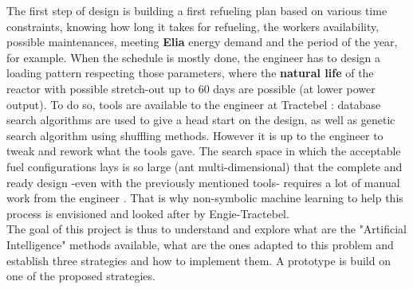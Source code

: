 \noindent The first step of design is building a first refueling plan based on various time constraints, knowing how long it takes for refueling, the workers availability, possible maintenances, meeting \textbf{Elia} energy demand and the period of the year, for example. When the schedule is mostly done, the engineer has to design a loading pattern respecting those parameters, where the \textbf{natural life} of the reactor with possible stretch-out up to 60 days are possible (at lower power output). To do so, tools are available to the engineer at Tractebel : database search algorithms are used to give a head start on the design, as well as genetic search algorithm using shuffling methods. However it is up to the engineer to tweak and rework what the tools gave. The search space in which the acceptable fuel configurations lays is so large (ant multi-dimensional) that the complete and ready design -even with the previously mentioned tools- requires a lot of manual work from the engineer \cite{ephraim19}. That is why non-symbolic machine learning to help this process is envisioned and looked after by Engie-Tractebel. \\

\noindent The goal of this project is thus to understand and explore what are the "Artificial Intelligence" methods available, what are the ones adapted to this problem and establish three strategies and how to implement them. A prototype is build on one of the proposed strategies. 

\begin{comment}
\noindent To be clear, the loading pattern design has to be completely defined from the local crayons fission parameters, which would be the reactivity, local burnup, global criticality, and local criticality. Moreover locally the cells in the reactor have preferential directions for neutron transport. That has to be taken into account when designing the loading pattern. Finally (and this is more specific to Tihange 2 reactor, but can be for all reactors), the heat peak delta f has to be minimized and non-local on the edges of the reactor to avoid a neutronic bombardment too high on the reflectors. \\

\noindent The loading pattern is usually completely managed by hand, after using internal tools based on genetic algorithm and database comparison. For designing a refined IA algorithm that would be able to further automatize the process both tools are available. In this paper three strategies have to be explored, seeing if indeed such an algorithm would be economical to use and develop. Of course the first step would then to unequivocally define the problem which has to be solved by the algorithm, making a list of constraints (physical, security norms, and economical constraints). We will see what algorithm or already used method in the industry would be the smart choice. Finally based on the three possibilities and after analysis of feasibility we will see what strategy can be prototyped within time constraints and resources available. \\
\end{comment}
